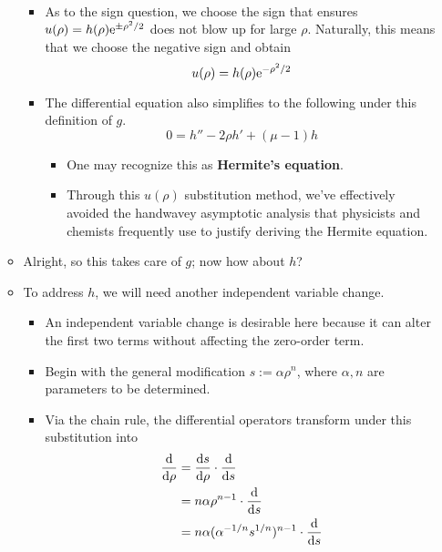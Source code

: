 \documentclass[../finalProject.tex]{subfiles}
\begin{document}
\begin{itemize}
\begin{itemize}
\begin{itemize}
\begin{align*}
            \end{align*}
            \item As to the sign question, we choose the sign that ensures $u(\rho)=h(\rho)\e[\pm\rho^2/2]$ does not blow up for large $\rho$. Naturally, this means that we choose the negative sign and obtain
            \begin{equation*}
                u(\rho) = h(\rho)\e[-\rho^2/2]
            \end{equation*}
            \item The differential equation also simplifies to the following under this definition of $g$.
            \begin{equation*}
                0 = h''-2\rho h'+(\mu-1)h
            \end{equation*}
            \begin{itemize}
                \item One may recognize this as \textbf{Hermite's equation}.
                \item Through this $u(\rho)$ substitution method, we've effectively avoided the handwavey asymptotic analysis that physicists and chemists frequently use to justify deriving the Hermite equation.
            \end{itemize}
        \end{itemize}
        \item Alright, so this takes care of $g$; now how about $h$?
        \item To address $h$, we will need another independent variable change.
        \begin{itemize}
            \item An independent variable change is desirable here because it can alter the first two terms without affecting the zero-order term.
            \item Begin with the general modification $s:=\alpha\rho^n$, where $\alpha,n$ are parameters to be determined.
            \item Via the chain rule, the differential operators transform under this substitution into
            \begin{align*}
                \dv{\rho} &= \dv{s}{\rho}\cdot\dv{s}\\
                &= n\alpha\rho^{n-1}\cdot\dv{s}\\
                &= n\alpha(\alpha^{-1/n}s^{1/n})^{n-1}\cdot\dv{s}\\

\end{align*}
\end{itemize}
\end{itemize}
\end{itemize}
\end{document}
